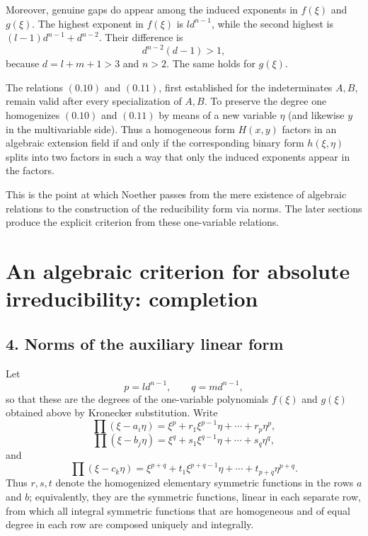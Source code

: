 \documentclass[11pt]{article}
\begin{document}
Moreover, genuine gaps do appear among the induced exponents in $f(\xi)$ and $g(\xi)$. The highest exponent in $f(\xi)$ is $l d^{n-1}$, while the second highest is $(l-1)d^{n-1}+d^{n-2}$. Their difference is
\[
d^{n-2}(d-1)>1,
\]
because $d=l+m+1>3$ and $n>2$. The same holds for $g(\xi)$.

The relations \((0.10)\) and \((0.11)\), first established for the indeterminates $A,B$, remain valid after every specialization of $A,B$. To preserve the degree one homogenizes \((0.10)\) and \((0.11)\) by means of a new variable $\eta$ (and likewise $y$ in the multivariable side). Thus a homogeneous form $H(x,y)$ factors in an algebraic extension field if and only if the corresponding binary form $h(\xi,\eta)$ splits into two factors in such a way that only the induced exponents appear in the factors.

This is the point at which Noether passes from the mere existence of algebraic relations to the construction of the reducibility form via norms. The later sections produce the explicit criterion from these one-variable relations.

\clearpage
\section{An algebraic criterion for absolute irreducibility: completion}

\subsection*{4. Norms of the auxiliary linear form}

Let
\[
  p = l d^{n-1}, \qquad q = m d^{n-1},
\]
so that these are the degrees of the one-variable polynomials $f(\xi)$ and $g(\xi)$ obtained above by Kronecker substitution. Write
\[
  \prod (\xi-a_i\eta)=\xi^p+r_1\xi^{p-1}\eta+\cdots+r_p\eta^p,
\]
\[
  \prod (\xi-b_j\eta)=\xi^q+s_1\xi^{q-1}\eta+\cdots+s_q\eta^q,
\]
and
\[
  \prod (\xi-c_k\eta)=\xi^{p+q}+t_1\xi^{p+q-1}\eta+\cdots+t_{p+q}\eta^{p+q}.
\]
Thus $r,s,t$ denote the homogenized elementary symmetric functions in the rows $a$ and $b$; equivalently, they are the symmetric functions, linear in each separate row, from which all integral symmetric functions that are homogeneous and of equal degree in each row are composed uniquely and integrally.
\end{document}
